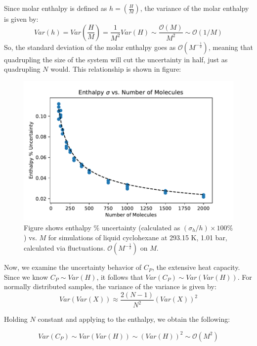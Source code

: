 \documentclass[aps,pre,twocolumn,nofootinbib,superscriptaddress,linenumbers,10pt, draft,tightenlines]{revtex4-1}
\begin{document}
Since molar enthalpy is defined as $h=\left(\frac{H}{M}\right)$, the variance of the molar enthalpy is given by:
\begin{equation}
Var(h) = Var\left(\frac{H}{M}\right) = \frac{1}{M^2} Var(H) \sim \frac{\mathcal{O}(M)}{M^2} \sim \mathcal{O} (1/M)
\end{equation}
So, the standard deviation of the molar enthalpy goes as $\mathcal{O} (M^{-\frac{1}{2}})$, meaning that quadrupling the size of the system will cut the uncertainty in half, just as quadrupling $N$ would.  This relationship is shown in figure:

\begin{figure}[H]
\includegraphics[width=\textwidth-40pt]{enthalpy_stdev_vs_number_of_molecules.pdf}
\caption{Figure shows enthalpy \% uncertainty (calculated as $(\sigma_{h}/h) \times 100 \%$) vs. $M$ for simulations of liquid cyclohexane at 293.15 K, 1.01 bar, calculated via fluctuations. $\mathcal{O} (M^{-\frac{1}{2}})$ on $M$.}
\end{figure}

Now, we examine the uncertainty behavior of $C_P$, the extensive heat capacity.  Since we know $C_P \sim Var(H)$, it follows that $ Var(C_P) \sim Var(Var(H)) $.  For normally distributed samples, the variance of the variance is given by:
\begin{equation}
Var(Var(X)) \approx \frac{2(N-1)}{N^2} (Var(X))^2
\end{equation}

Holding $N$ constant and applying to the enthalpy, we obtain the following:

\begin{equation}
Var(C_P) \sim Var(Var(H)) \sim (Var(H))^2 \sim \mathcal{O}(M^2)
\end{equation}
\end{document}
